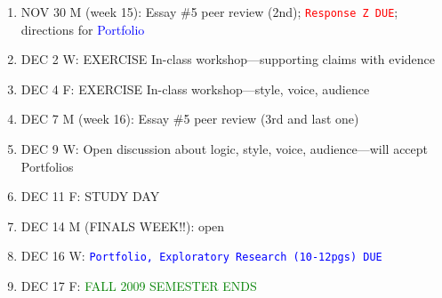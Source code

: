 \documentclass[11pt]{article}
\begin{document}
\begin{enumerate}
\item NOV 30 M (week 15): Essay \#5 peer review (2nd); \textcolor{red}{\texttt{Response Z DUE}}; directions for \textcolor{blue}{Portfolio}
\item[] DEC 2 W: EXERCISE In-class workshop---supporting claims with evidence
\item[] DEC 4 F: EXERCISE In-class workshop---style, voice, audience

\item DEC 7 M (week 16): Essay \#5 peer review (3rd and last one)
\item[] DEC 9 W:  Open discussion about logic, style, voice, audience---will accept Portfolios
\item[] DEC 11 F: STUDY DAY

\item DEC 14 M (FINALS WEEK!!): open
\item[] DEC 16 W: \textcolor{blue}{\texttt{Portfolio, Exploratory Research (10-12pgs) DUE}}
\item[] DEC 17 F: \textcolor{green}{FALL 2009 SEMESTER ENDS}
\end{enumerate}
\end{document}
